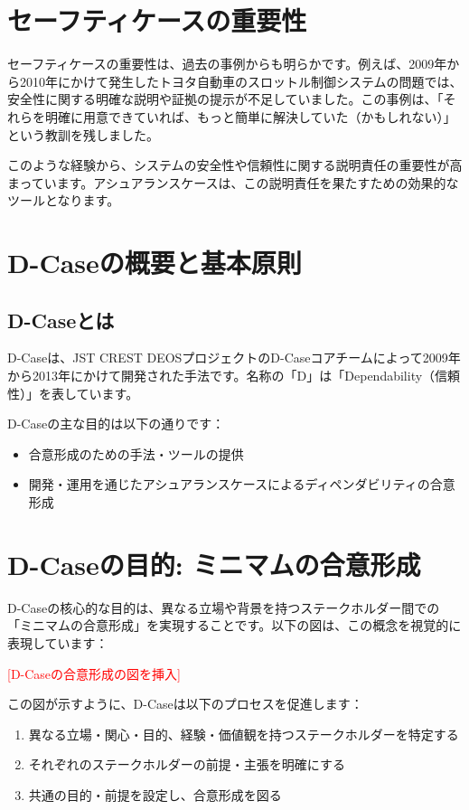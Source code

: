 \section{セーフティケースの重要性}

セーフティケースの重要性は、過去の事例からも明らかです。例えば、2009年から2010年にかけて発生したトヨタ自動車のスロットル制御システムの問題では、安全性に関する明確な説明や証拠の提示が不足していました。この事例は、「それらを明確に用意できていれば、もっと簡単に解決していた（かもしれない）」という教訓を残しました。

このような経験から、システムの安全性や信頼性に関する説明責任の重要性が高まっています。アシュアランスケースは、この説明責任を果たすための効果的なツールとなります。

\section{D-Caseの概要と基本原則}

\subsection{D-Caseとは}

D-Caseは、JST CREST DEOSプロジェクトのD-Caseコアチームによって2009年から2013年にかけて開発された手法です。名称の「D」は「Dependability（信頼性）」を表しています。

D-Caseの主な目的は以下の通りです：

\begin{itemize}
    \item 合意形成のための手法・ツールの提供
    \item 開発・運用を通じたアシュアランスケースによるディペンダビリティの合意形成
\end{itemize}

\section{D-Caseの目的: ミニマムの合意形成}

D-Caseの核心的な目的は、異なる立場や背景を持つステークホルダー間での「ミニマムの合意形成」を実現することです。以下の図は、この概念を視覚的に表現しています：

\textcolor{red}{[D-Caseの合意形成の図を挿入]}

この図が示すように、D-Caseは以下のプロセスを促進します：

\begin{enumerate}
    \item 異なる立場・関心・目的、経験・価値観を持つステークホルダーを特定する
    \item それぞれのステークホルダーの前提・主張を明確にする
    \item 共通の目的・前提を設定し、合意形成を図る
\end{enumerate}

